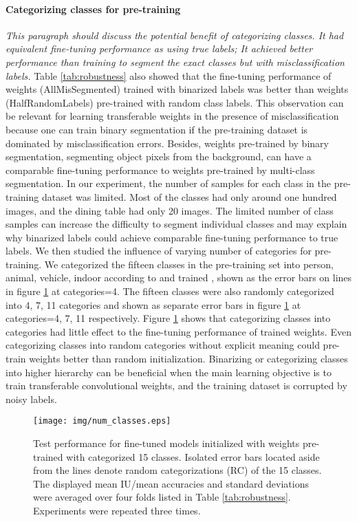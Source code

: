 \paragraph{Categorizing classes for pre-training}
\noindent \textit{This paragraph should discuss the potential benefit of categorizing classes. It had equivalent fine-tuning performance as using true labels; It achieved better performance than training to segment the exact classes but with misclassification labels.}
\noindent
Table \ref{tab:robustness} also showed that the fine-tuning performance of weights (AllMisSegmented) trained with binarized labels was better than weights (HalfRandomLabels) pre-trained with random class labels.
This observation can be relevant for learning transferable weights in the presence of misclassification because one can train binary segmentation if the pre-training dataset is dominated by misclassification errors.
Besides, weights pre-trained by binary segmentation, segmenting object pixels from the background, can have a comparable fine-tuning performance to weights pre-trained by multi-class segmentation.
In our experiment, the number of samples for each class in the pre-training dataset was limited.
Most of the classes had only around one hundred images, and the dining table had only 20 images.
The limited number of class samples can increase the difficulty to segment individual classes and may explain why binarized labels could achieve comparable fine-tuning performance to true labels.
We then studied the influence of varying number of categories for pre-training.
We categorized the fifteen classes in the pre-training set into person, animal, vehicle, indoor according to \cite{everingham2015pascal} and trained , shown as the error bars on lines in figure \ref{fig:categories} at categories=4.
The fifteen classes were also randomly categorized into 4, 7, 11 categories and shown as separate error bars in figure \ref{fig:categories} at categories=4, 7, 11 respectively.
Figure \ref{fig:categories} shows that categorizing classes into categories had little effect to the fine-tuning performance of trained weights.
Even categorizing classes into random categories without explicit meaning could pre-train weights better than random initialization.
Binarizing or categorizing classes into higher hierarchy can be beneficial when the main learning objective is to train transferable convolutional weights, and the training dataset is corrupted by noisy labels.


\begin{figure}[t]
\centering
   \texttt{[image: img/num\_classes.eps]}
\caption{
Test performance for fine-tuned models initialized with weights pre-trained with categorized 15 classes.
Isolated error bars located aside from the lines denote random categorizations (RC) of the 15 classes.
The displayed mean IU/mean accuracies and standard deviations were averaged over four folds listed in Table \ref{tab:robustness}.
Experiments were repeated three times.
}
\label{fig:categories}
\end{figure}

